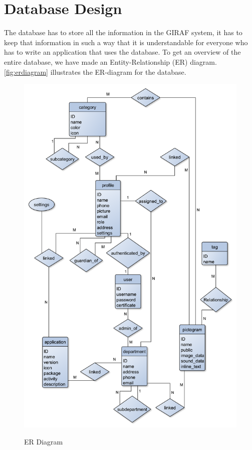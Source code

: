 \section{Database Design}
The database has to store all the information in the GIRAF system, it has to keep that information in such a way that it is understandable for everyone who has to write an application that uses the database.
To get an overview of the entire database, we have made an Entity-Relationship (ER) diagram. \autoref{fig:erdiagram} illustrates the ER-diagram for the database.

\begin{figure}[hptb]
\begin{center}
\includegraphics[width=\textwidth]{img/ER_diagram3.pdf}
\label{fig:erdiagram}
\caption{ER Diagram}
\end{center}
\end{figure}


